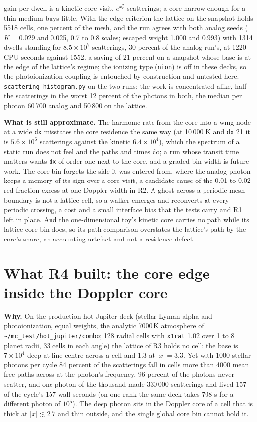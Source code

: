 \documentclass[11pt]{article}
\newcommand{\key}[1]{\texttt{#1}}
\begin{document}
gain per dwell is a kinetic core visit, $e^{x_c^2}$ scatterings; a core narrow
enough for a thin medium buys little.
With the edge criterion the lattice on the snapshot holds 5518 cells, one percent of
the mesh, and the run agrees with both analog seeds ($K = 0.029$ and 0.025, 0.7 to
0.8 scales; escaped weight 1.000 and 0.993) with 1314 dwells standing for
$8.5\times10^7$ scatterings, 30 percent of the analog run's, at 1220 CPU seconds
against 1552, a saving of 21 percent on a snapshot whose base is at the edge of the
lattice's regime; the ionizing type (\texttt{nion}) is off in these decks, so the
photoionization coupling is untouched by construction and untested here.
\texttt{scattering\_histogram.py} on the two runs: the work is concentrated alike,
half the scatterings in the worst 12 percent of the photons in both, the median
per photon 60\,700 analog and 50\,800 on the lattice.

\textbf{What is still approximate.}  The harmonic rate from the core into a wing
node at a wide \key{dx} misstates the core residence the same way (at 10\,000 K and
\key{dx} 21 it is $5.6\times10^6$ scatterings against the kinetic $6.4\times10^4$),
which the spectrum of a static run does not feel and the paths and times do; a run
whose transit time matters wants \key{dx} of order one next to the core, and a
graded bin width is future work.  The core bin forgets the side it was entered from,
where the analog photon keeps a memory of its sign over a core visit, a candidate
cause of the 0.01 to 0.02 red-fraction excess at one Doppler width in R2.  A ghost
across a periodic mesh boundary is not a lattice cell, so a walker emerges and
reconverts at every periodic crossing, a cost and a small interface bias that the
tests carry and R1 left in place.  And the one-dimensional toy's kinetic core carries
no path while its lattice core bin does, so its path comparison overstates the
lattice's path by the core's share, an accounting artefact and not a residence
defect.

\section{What R4 built: the core edge inside the Doppler core}
\label{sec:r4}

\textbf{Why.}  On the production hot Jupiter deck (stellar Lyman alpha and
photoionization, equal weights, the analytic 7000\,K atmosphere of
\texttt{\~{}/mc\_test/hot\_jupiter/combo}; 128 radial cells with \key{x1rat} 1.02 over
1 to 8 planet radii, 33 cells in each angle) the lattice of R3 holds no cell: the base is
$7\times10^4$ deep at line centre across a cell and 1.3 at $|x| = 3.3$.  Yet with 1000
stellar photons per cycle 84 percent of the scatterings fall in cells more than 4000 mean
free paths across at the photon's frequency, 96 percent of the photons never scatter,
and one photon of the thousand made 330\,000 scatterings and lived 157 of the cycle's
157 wall seconds (on one rank the same deck takes 708 s for a different photon of
$10^5$).  The deep photon sits in the Doppler core of a cell that is thick at $|x|
\lesssim 2.7$ and thin outside, and the single global core bin cannot hold it.
\end{document}
